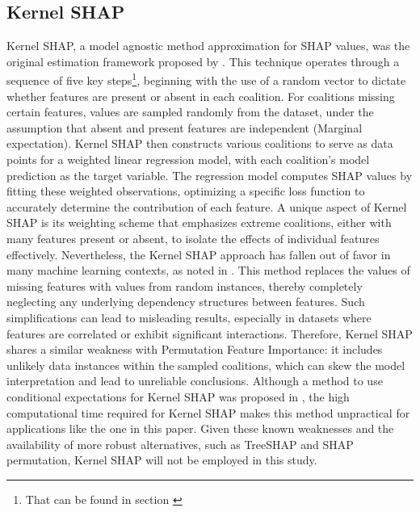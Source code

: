 \documentclass[12pt]{article}
\begin{document}
\subsection{Kernel SHAP}
Kernel SHAP, a model agnostic method approximation for SHAP values, was the original estimation framework proposed by \cite{10.5555/3295222.3295230}.
This technique operates through a sequence of five key steps\footnote{That can be found in section \cite[Section~9.6]{molnar2022}}, beginning with the use of a random vector to dictate whether features are present or absent in each coalition.
For coalitions missing certain features, values are sampled randomly from the dataset, under the assumption that absent and present features are independent (Marginal expectation).
Kernel SHAP then constructs various coalitions to serve as data points for a weighted linear regression model, with each coalition's model prediction as the target variable. The regression model computes SHAP values by fitting these weighted observations, optimizing a specific loss function to accurately determine the contribution of each feature.
A unique aspect of Kernel SHAP is its weighting scheme that emphasizes extreme coalitions, either with many features present or absent, to isolate the effects of individual features effectively. 
Nevertheless, the Kernel SHAP approach has fallen out of favor in many machine learning contexts, as noted in \cite{molnarSHAP}.
This method replaces the values of missing features with values from random instances, thereby completely neglecting any underlying dependency structures between features. Such simplifications can lead to misleading results, especially in datasets where features are correlated or exhibit significant interactions.
Therefore, Kernel SHAP shares a similar weakness with Permutation Feature Importance: it includes unlikely data instances within the sampled coalitions, which can skew the model interpretation and lead to unreliable conclusions.
Although a method to use conditional expectations for Kernel SHAP was proposed in \cite{Aal}, the high computational time required for Kernel SHAP makes this method unpractical for applications like the one in this paper.
Given these known weaknesses and the availability of more robust alternatives, such as TreeSHAP and SHAP permutation, Kernel SHAP will not be employed in this study.
\end{document}

